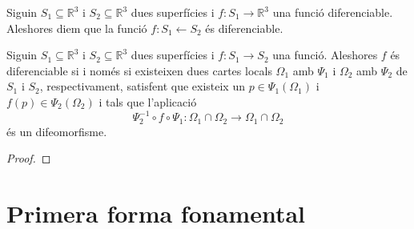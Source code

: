 \documentclass[../../Main.tex]{subfiles}
\begin{document}
	\begin{definition}
		\label{def:funció diferenciable entre superfícies}
		Siguin \(S_{1}\subseteq\mathbb{R}^{3}\) i \(S_{2}\subseteq\mathbb{R}^{3}\) dues superfícies i \(f\colon S_{1}\longrightarrow\mathbb{R}^{3}\) una funció diferenciable. Aleshores diem que la funció \(f\colon S_{1}\longleftarrow S_{2}\) és diferenciable.
	\end{definition}
	\begin{proposition}
		Siguin \(S_{1}\subseteq\mathbb{R}^{3}\) i \(S_{2}\subseteq\mathbb{R}^{3}\) dues superfícies i \(f\colon S_{1}\longrightarrow S_{2}\) una funció. Aleshores \(f\) és diferenciable si i només si existeixen dues cartes locals \(\Omega_{1}\) amb \(\Psi_{1}\) i \(\Omega_{2}\) amb \(\Psi_{2}\) de \(S_{1}\) i \(S_{2}\), respectivament, satisfent que existeix un \(p\in\Psi_{1}(\Omega_{1})\) i \(f(p)\in\Psi_{2}(\Omega_{2})\) i tals que l'aplicació
		\[
		    \Psi_{2}^{-1}\circ f\circ \Psi_{1}\colon\Omega_{1}\cap\Omega_{2}\longrightarrow\Omega_{1}\cap\Omega_{2}
		\]
		és un difeomorfisme.
		\begin{proof}
		\end{proof}
	\end{proposition}
	\section{Primera forma fonamental}
\end{document}
